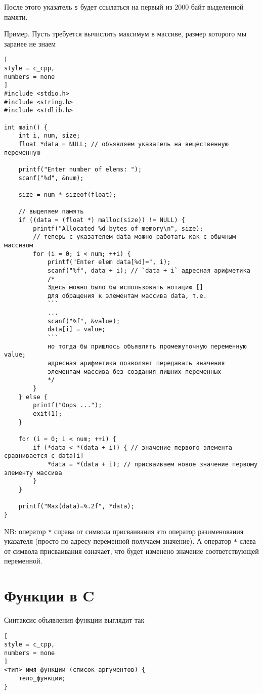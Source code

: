 \documentclass[%
	11pt,
	a4paper,
	utf8,
		]{article}
\begin{document}
После этого указатель \verb|s| будет ссылаться на первый из 2000 байт выделенной памяти.

Пример. Пусть требуется вычислить максимум в массиве, размер которого мы заранее не знаем
\begin{lstlisting}[
style = c_cpp,
numbers = none
]
#include <stdio.h>
#include <string.h>
#include <stdlib.h>

int main() {
	int i, num, size;
	float *data = NULL; // объявляем указатель на вещественную переменную
	
	printf("Enter number of elems: ");
	scanf("%d", &num);
	
	size = num * sizeof(float);
	
	// выделяем память
	if ((data = (float *) malloc(size)) != NULL) {
		printf("Allocated %d bytes of memory\n", size);
		// теперь с указателем data можно работать как с обычным массивом
		for (i = 0; i < num; ++i) {
			printf("Enter elem data[%d]=", i);
			scanf("%f", data + i); // `data + i` адресная арифметика
			/*
			Здесь можно было бы использовать нотацию []
			для обращения к элементам массива data, т.е.
			```
			...
			scanf("%f", &value);
			data[i] = value;
			```
			но тогда бы пришлось объявлять промежуточную переменную value;
			адресная арифметика позволяет передавать значения
			элементам массива без создания лишних переменных
			*/
		}
	} else {
		printf("Oops ...");
		exit(1);
	}
	
	for (i = 0; i < num; ++i) {
		if (*data < *(data + i)) { // значение первого элемента сравнивается с data[i]
			*data = *(data + i); // присваиваем новое значение первому элементу массива
		}
	}
	
	printf("Max(data)=%.2f", *data);
}
\end{lstlisting}

NB: оператор \verb|*| справа от символа присваивания это оператор разименования указателя (просто по адресу переменной получаем значение). А оператор \verb|*| слева от символа присваивания означает, что будет изменено значение соответствующей переменной.

\section{Функции в C}

Синтаксис объявления функции выглядит так
\begin{lstlisting}[
style = c_cpp,
numbers = none
]
<тип> имя_функции (список_аргументов) {
    тело_функции;
}
\end{lstlisting}
\end{document}
